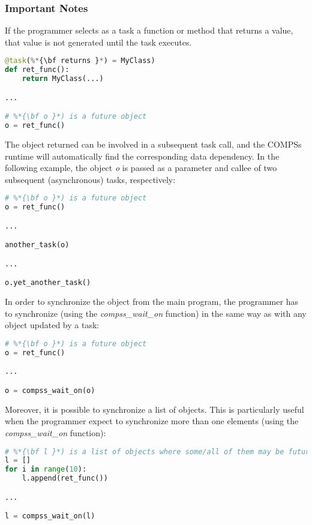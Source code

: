 \subsubsection{Important Notes}

If the programmer selects as a task a function or method that returns a value, that value is not 
generated until the task executes. 

\begin{lstlisting}[language=python]
@task(%*{\bf returns }*) = MyClass)
def ret_func():
    return MyClass(...)

...

# %*{\bf o }*) is a future object
o = ret_func()
\end{lstlisting}

The object returned can be involved in a subsequent task call, and the COMPSs runtime will automatically 
find the corresponding data dependency. In the following example, the object \textit{o} is passed as a parameter 
and callee of two subsequent (asynchronous) tasks, respectively:

\begin{lstlisting}[language=python]
# %*{\bf o }*) is a future object
o = ret_func()

...

another_task(o)

...

o.yet_another_task()
\end{lstlisting}

In order to synchronize the object from the main program, the programmer has to synchronize (using the \textit{compss\_wait\_on} function) in the same way 
as with any object updated by a task:

\begin{lstlisting}[language=python]
# %*{\bf o }*) is a future object
o = ret_func()

...

o = compss_wait_on(o)
\end{lstlisting}
                         
Moreover, it is possible to synchronize a list of objects. This is particularly useful when the programmer expect to synchronize more 
than one elements (using the \textit{compss\_wait\_on} function):

\begin{lstlisting}[language=python]
# %*{\bf l }*) is a list of objects where some/all of them may be future objects
l = []
for i in range(10):
    l.append(ret_func())

...

l = compss_wait_on(l)
\end{lstlisting}
                         

